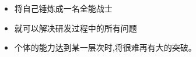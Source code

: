 \documentclass[11pt]{article}
\begin{document}
\begin{comment}

  这是一个很典型的心得,因为我遇到过很多类似的想法。 让我们分析一下:
\end{comment}

\begin{myquote}

  \begin{itemize}
  \item 将自己锤炼成一名全能战士
  \item 就可以解决研发过程中的所有问题
  \end{itemize}
\end{myquote}

\begin{comment}

  说这个不对,我非常同意。将自己锤炼成一名全能战士还不一定可以解决研发过程中的所有问题。我也不记得说过这
  样的话。在每一个问题提出来的时候,都有一些我们可以控制的因素,有一些我们不可以控制的因素。我只是说,我们
  只能够把我们可以控制的因素做好。这个包括影响自己不可以控制的因素,但后果我们不可以控制。

  这样做,自己是否可以变成一个全能战士,不是任何人可能期待的。``全能''是很难定义的,而且是更难达到的。

  但是我们要不断自我提高。到怎么程度,要看每个人自己了。但是我们不能说:``因为有自己不可控制的因素(人家
  的,制度的问题),我们自己就可以不努力了,不提高了。不断自我提高就是解决问题的最基本的态度。 也是代表人的
  智慧和上进心。

\end{comment}

\begin{myquote}

  \begin{itemize}
  \item 个体的能力达到某一层次时,将很难再有大的突破。 
  \end{itemize}
\end{myquote}
\end{document}
